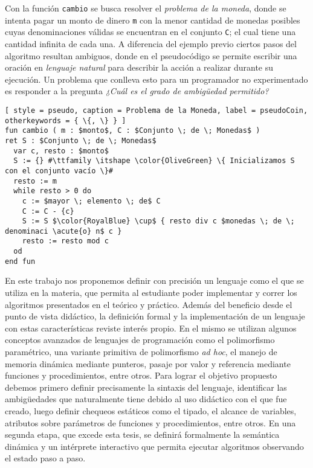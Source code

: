 Con la función \lstinline[style = pseudo]{cambio} se busca resolver el \textit{problema de la moneda}, donde se intenta pagar un monto de dinero \lstinline[style = pseudo]{m} con la menor cantidad de monedas posibles cuyas denominaciones válidas se encuentran en el conjunto \lstinline[style = pseudo]{C}; el cual tiene una cantidad infinita de cada una.
A diferencia del ejemplo previo ciertos pasos del algoritmo resultan ambiguos, donde en el pseudocódigo se permite escribir una oración en \textit{lenguaje natural} para describir la acción a realizar durante su ejecución.
Un problema que conlleva esto para un programador no experimentado es responder a la pregunta \textit{¿Cuál es el grado de ambigüedad permitido?}

\begin{lstlisting}[ style = pseudo, caption = Problema de la Moneda, label = pseudoCoin, otherkeywords = { \{, \} } ]
fun cambio ( m : $monto$, C : $Conjunto \; de \; Monedas$ )
ret S : $Conjunto \; de \; Monedas$
  var c, resto : $monto$
  S := {} #\ttfamily \itshape \color{OliveGreen} \{ Inicializamos S con el conjunto vacío \}#
  resto := m
  while resto > 0 do
    c := $mayor \; elemento \; de$ C
    C := C - {c}
    S := S $\color{RoyalBlue} \cup$ { resto div c $monedas \; de \; denominaci \acute{o} n$ c }
    resto := resto mod c
  od
end fun
\end{lstlisting}


En este trabajo nos proponemos definir con precisión un lenguaje como el que se utiliza en la materia, que permita al estudiante poder implementar y correr los algoritmos presentados en el teórico y práctico.
Además del beneficio desde el punto de vista didáctico, la definición formal y la implementación de un lenguaje con estas características reviste interés propio.
En el mismo se utilizan algunos conceptos avanzados de lenguajes de programación como el polimorfismo paramétrico, una variante primitiva de polimorfismo \textit{ad hoc}, el manejo de memoria dinámica mediante punteros, pasaje por valor y referencia mediante funciones y procedimientos, entre otros.
Para lograr el objetivo propuesto debemos primero definir precisamente la sintaxis del lenguaje, identificar las ambigüedades que naturalmente tiene debido al uso didáctico con el que fue creado, luego definir chequeos estáticos como el tipado, el alcance de variables, atributos sobre parámetros de funciones y procedimientos, entre otros.
En una segunda etapa, que excede esta tesis, se definirá formalmente la semántica dinámica y un intérprete interactivo que permita ejecutar algoritmos observando el estado paso a paso.

